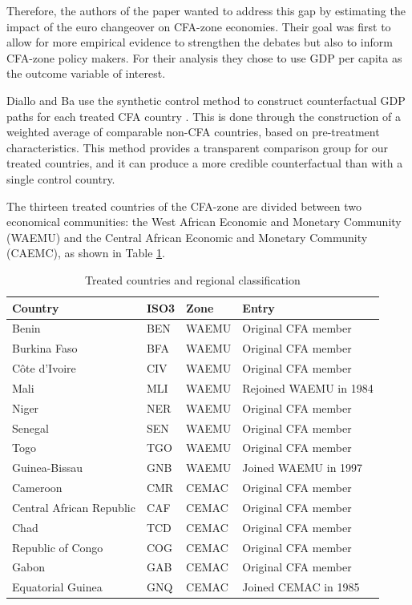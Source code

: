 \documentclass[a4paper]{article}
\begin{document}
Therefore, the authors of the paper wanted to address this gap by estimating the impact of the euro changeover on CFA-zone economies. Their goal was first to allow for more empirical evidence to strengthen the debates but also to inform CFA-zone policy makers. For their analysis they chose to use GDP per capita as the outcome variable of interest. 

Diallo and Ba use the synthetic control method to construct counterfactual GDP paths for each treated CFA country \citep{abadie2021using,abadie2010synthetic}. This is done through the construction of a weighted average of comparable non-CFA countries, based on pre-treatment characteristics. This method provides a transparent comparison group for our treated countries, and it can produce a more credible counterfactual than with a single control country. 

The thirteen treated countries of the CFA-zone are divided between two economical communities: the West African Economic and Monetary Community (WAEMU) and the Central African Economic and Monetary Community (CAEMC), as shown in Table \ref{tab:treated_countries}. 

\begin{table}[h!]
\centering
\caption{Treated countries and regional classification}
\label{tab:treated_countries}
\begin{tabular}{llll}
\toprule
Country & ISO3 & Zone & Entry \\
\midrule
Benin & BEN & WAEMU  & Original CFA member \\
Burkina Faso & BFA & WAEMU  & Original CFA member \\
C\^{o}te d'Ivoire & CIV & WAEMU  & Original CFA member \\
Mali & MLI & WAEMU  & Rejoined WAEMU in 1984 \\
Niger & NER & WAEMU  & Original CFA member \\
Senegal & SEN & WAEMU  & Original CFA member \\
Togo & TGO & WAEMU  & Original CFA member \\
Guinea-Bissau & GNB & WAEMU  & Joined WAEMU in 1997\\
\midrule
Cameroon & CMR & CEMAC  & Original CFA member \\
Central African Republic & CAF & CEMAC  & Original CFA member \\
Chad & TCD & CEMAC  & Original CFA member \\
Republic of Congo & COG & CEMAC & Original CFA member \\
Gabon & GAB & CEMAC  & Original CFA member \\
Equatorial Guinea & GNQ & CEMAC & Joined CEMAC in 1985 \\
\bottomrule
\end{tabular}
\end{table}
\end{document}
